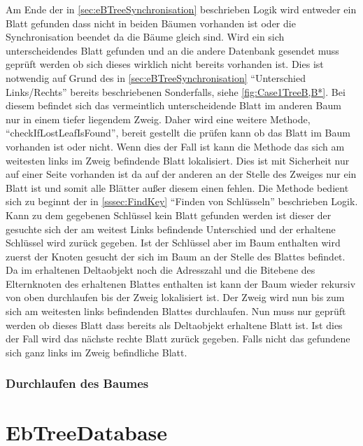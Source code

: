 \documentclass[a4paper,11pt,oneside,%
headsepline,												%
footsepline,												%
bibtotocnumbered									%
]{scrreprt}
\begin{document}
Am Ende der in \autoref{sec:eBTreeSynchronisation} beschrieben Logik wird entweder ein Blatt gefunden dass nicht in beiden Bäumen vorhanden ist oder die Synchronisation beendet da die Bäume gleich sind. Wird ein sich unterscheidendes Blatt gefunden und an die andere Datenbank gesendet muss geprüft werden ob sich dieses wirklich nicht bereits vorhanden ist. Dies ist notwendig auf Grund des in \autoref{sec:eBTreeSynchronisation} \enquote{Unterschied Links/Rechts} bereits beschriebenen Sonderfalls, siehe \autoref{fig:Case1TreeB,B*}. Bei diesem befindet sich das vermeintlich unterscheidende Blatt im anderen Baum nur in einem tiefer liegendem Zweig. Daher wird eine weitere Methode, \enquote{checkIfLostLeafIsFound}, bereit gestellt die prüfen kann ob das Blatt im Baum vorhanden ist oder nicht. Wenn dies der Fall ist kann die Methode das sich am weitesten links im Zweig befindende Blatt lokalisiert. Dies ist mit Sicherheit nur auf einer Seite vorhanden ist da auf der anderen an der Stelle des Zweiges nur ein Blatt ist und somit alle Blätter außer diesem einen fehlen. Die Methode bedient sich zu beginnt der in \autoref{sssec:FindKey} \enquote{Finden von Schlüsseln} beschrieben Logik. Kann zu dem gegebenen Schlüssel kein Blatt gefunden werden ist dieser der gesuchte sich der am weitest Links befindende Unterschied und der erhaltene Schlüssel wird zurück gegeben. Ist der Schlüssel aber im Baum enthalten wird zuerst der Knoten gesucht der sich im Baum an der Stelle des Blattes befindet. Da im erhaltenen Deltaobjekt noch die Adresszahl und die Bitebene des Elternknoten des erhaltenen Blattes enthalten ist kann der Baum wieder rekursiv von oben durchlaufen bis der Zweig lokalisiert ist. Der Zweig wird nun bis zum sich am weitesten links befindenden Blattes durchlaufen. Nun muss nur geprüft werden ob dieses Blatt dass bereits als Deltaobjekt erhaltene Blatt ist. Ist dies der Fall wird das nächste rechte Blatt zurück gegeben. Falls nicht das gefundene sich ganz links im Zweig befindliche Blatt. 
\subsubsection{Durchlaufen des Baumes}




\section{EbTreeDatabase}
\end{document}
